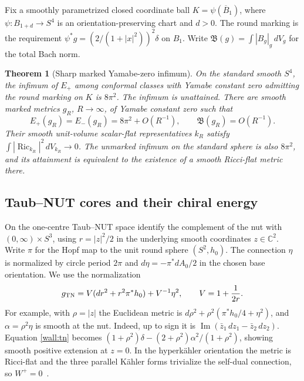 \documentclass[11pt]{article}
\numberwithin{equation}{section}
\newtheorem{theorem}{Theorem}[section]
\theoremstyle{definition}
\theoremstyle{remark}
\begin{document}
Fix a smoothly parametrized closed coordinate ball
\(K=\psi(\overline B_1)\), where \(\psi:B_{1+d}\to S^4\) is an
orientation-preserving chart and \(d>0\). The round marking is the
requirement \(\psi^*g=(2/(1+|x|^2))^2\delta\) on \(B_1\).
Write \(\mathfrak B(g)=\int |B_g|_g\,dV_g\) for the total Bach norm.

\begin{theorem}[Sharp marked Yamabe-zero infimum]\label{wall:main}
On the standard smooth \(S^4\), the infimum of \(E_+\) among
conformal classes with Yamabe constant zero admitting the round
marking on \(K\) is \(8\pi^2\). The infimum is unattained. There are
smooth marked metrics \(g_R\), \(R\to\infty\), of Yamabe constant
zero such that
\[
 E_+(g_R)=E_-(g_R)=8\pi^2+O(R^{-1}),\qquad
 \mathfrak B(g_R)=O(R^{-1}).
\]
Their smooth unit-volume scalar-flat representatives \(k_R\)
satisfy \(\int|\operatorname{Ric}_{k_R}|^2\,dV_{k_R}\to0\).
The unmarked infimum on the standard sphere is also \(8\pi^2\),
and its attainment is equivalent to the existence of a smooth
Ricci-flat metric there.
\end{theorem}

\subsection{Taub--NUT cores and their chiral energy}

On the one-centre Taub--NUT space identify the complement of the
nut with \((0,\infty)\times S^3\), using \(r=|z|^2/2\) in the
underlying smooth coordinates \(z\in\mathbb C^2\). Write \(\pi\) for
the Hopf map to the unit round sphere \((S^2,h_0)\). The connection
\(\eta\) is normalized by circle period \(2\pi\) and
\(d\eta=-\pi^*dA_0/2\) in the chosen base orientation. We use the
normalization
\begin{equation}\label{wall:tn}
 g_{\rm TN}=V(dr^2+r^2\pi^*h_0)+V^{-1}\eta^2,
 \qquad V=1+\frac{1}{2r}.
\end{equation}
For example, with \(\rho=|z|\) the Euclidean metric is
\(d\rho^2+\rho^2(\pi^*h_0/4+\eta^2)\), and
\(\alpha=\rho^2\eta\) is smooth at the nut. Indeed, up to sign it is
\(\operatorname{Im}(\bar z_1\,dz_1-\bar z_2\,dz_2)\).
Equation \eqref{wall:tn} becomes
\((1+\rho^2)\delta-(2+\rho^2)\alpha^2/(1+\rho^2)\), showing smooth
positive extension at \(z=0\). In the hyperkähler orientation
the metric is Ricci-flat and the three parallel Kähler forms
trivialize the self-dual connection, so \(W^+=0\)~\cite[\S2.1, (1)]{CherkisHurtubise2019Monads}.
\end{document}
